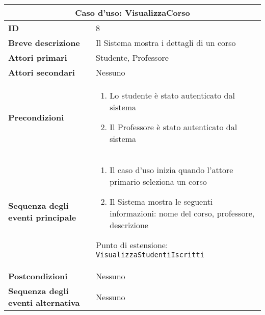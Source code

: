 \documentclass[11pt,a4paper]{report}
\begin{document}
\newpage

\begin{longtable}{|p{4cm}|p{10cm}|}
\hline
\multicolumn{2}{|c|}{\textbf{Caso d’uso: VisualizzaCorso}} \\
\hline
\textbf{ID} & 8 \\
\hline
\textbf{Breve descrizione} & Il Sistema mostra i dettagli di un corso \\
\hline
\textbf{Attori primari} & Studente, Professore \\
\hline
\textbf{Attori secondari} & Nessuno \\
\hline
\textbf{Precondizioni} & 
\begin{enumerate}[leftmargin=1em]
  \item Lo studente è stato autenticato dal sistema
  \item Il Professore è stato autenticato dal sistema
\end{enumerate} \\
\hline
\textbf{Sequenza degli eventi principale} & 
\begin{enumerate}[leftmargin=1em]
  \item Il caso d’uso inizia quando l’attore primario seleziona un corso
  \item Il Sistema mostra le seguenti informazioni: nome del corso, professore, descrizione
\end{enumerate}
Punto di estensione: \texttt{VisualizzaStudentiIscritti} \\
\hline
\textbf{Postcondizioni} & Nessuno \\
\hline
\textbf{Sequenza degli eventi alternativa} & Nessuno \\
\hline
\end{longtable}

\end{document}
